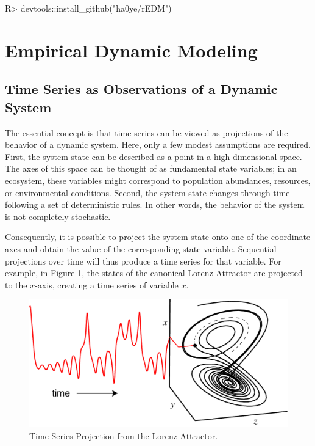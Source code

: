 \documentclass[article]{jss}
\begin{document}
\begin{Schunk}
\begin{Sinput}
R> devtools::install_github("ha0ye/rEDM")
\end{Sinput}
\end{Schunk}

\section{Empirical Dynamic Modeling}\label{sec:empirical-dynamic-modeling}

\subsection{Time Series as Observations of a Dynamic System}\label{sec:time-series}

The essential concept is that time series can be viewed as projections of the behavior of a dynamic system. Here, only a few modest assumptions are required. First, the system state can be described as a point in a high-dimensional space. The axes of this space can be thought of as fundamental state variables; in an ecosystem, these variables might correspond to population abundances, resources, or environmental conditions. Second, the system state changes through time following a set of deterministic rules. In other words, the behavior of the system is not completely stochastic.

Consequently, it is possible to project the system state onto one of the coordinate axes and obtain the value of the corresponding state variable. Sequential projections over time will thus produce a time series for that variable. For example, in Figure \ref{fig:time-series-projection}, the states of the canonical Lorenz Attractor \cite{Lorenz_1963} are projected to the $x$-axis, creating a time series of variable $x$.

\begin{figure}[t!]
\centering
\includegraphics{figure_1}
\caption{\label{fig:time-series-projection} Time Series Projection from the Lorenz Attractor.}
\end{figure}
\end{document}
